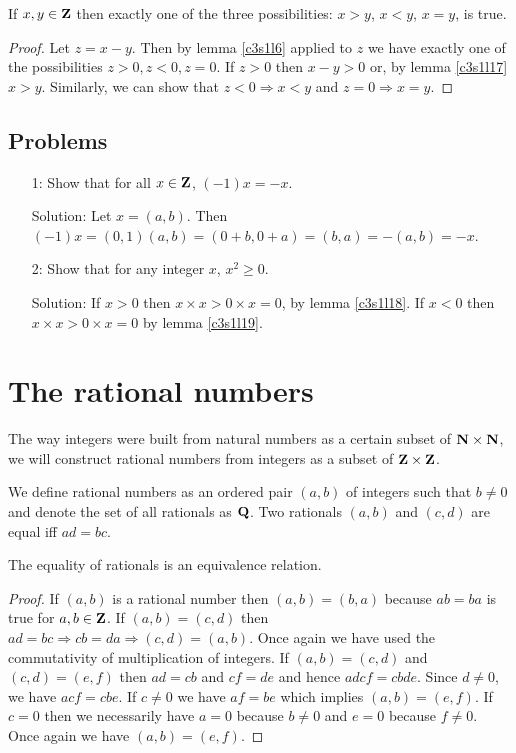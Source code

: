 \begin{lem}\label{c3s1l22}
If $x, y \in \mathbf{Z}$ then exactly one of the three possibilities: $x > y$,
$x < y$, $x = y$, is true.
\end{lem}
\begin{proof}
Let $z = x - y$. Then by lemma \ref{c3s1l6} applied to $z$ we have exactly
one of the possibilities $z > 0, z < 0, z = 0$. If $z > 0$ then $x - y > 0$
or, by lemma \ref{c3s1l17} $x > y$. Similarly, we can show that $z < 0
\Rightarrow x < y$ and $z = 0 \Rightarrow x = y$.
\end{proof}

\subsection{Problems}
\begin{enumerate}
\item[1:] Show that for all $x \in \mathbf{Z}$, $(-1)x = -x$.
\item[Solution:] Let $x = (a, b)$. Then $(-1)x = (0, 1)(a, b) = (0 + b, 0 +
a) = (b, a) = -(a, b) = -x$.

\item[2:] Show that for any integer $x$, $x^2 \ge 0$.
\item[Solution:] If $x > 0$ then $x \times x > 0 \times x = 0$, by lemma
\ref{c3s1l18}. If $x < 0$ then $x \times x > 0 \times x = 0$ by lemma 
\ref{c3s1l19}.
\end{enumerate}

\section{The rational numbers}\label{c3l2}
The way integers were built from natural numbers as a certain subset of 
$\mathbf{N} \times \mathbf{N}$, we will construct rational numbers from integers as a
subset of $\mathbf{Z} \times \mathbf{Z}$.

\begin{defn}\label{c3l2d1}
We define rational numbers as an ordered pair $(a, b)$ of integers such 
that $b \ne 0$ and denote the set of all rationals as $\mathbf{Q}$. Two 
rationals $(a, b)$ and $(c, d)$ are equal iff $ad = bc$.
\end{defn}

\begin{lem}\label{c3s2l1}
The equality of rationals is an equivalence relation.
\end{lem}
\begin{proof}
If $(a, b)$ is a rational number then $(a, b) = (b, a)$ because $ab = ba$
is true for $a, b \in \mathbf{Z}$. If $(a, b) = (c, d)$ then $ad = bc 
\Rightarrow cb = da \Rightarrow (c, d) = (a, b)$. Once again we have used
the commutativity of multiplication of integers. If $(a, b) = (c, d)$ and
$(c, d) = (e, f)$ then $ad = cb$ and $cf = de$ and hence $adcf = cbde$. 
Since $d \ne 0$, we have $acf = cbe$. If $c \ne 0$ we have $af = be$ 
which implies $(a, b) = (e, f)$. If $c = 0$ then we necessarily have $a=0$
because $b \ne 0$ and $e = 0$ because $f \ne 0$. Once again we have $(a, b)
= (e, f)$.
\end{proof}

